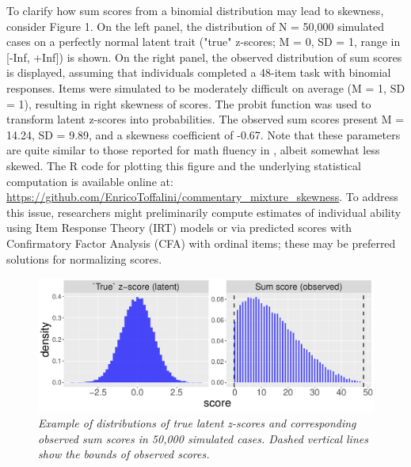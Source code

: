 \documentclass[letterpaper,11pt]{article}
\begin{document}
To clarify how sum scores from a binomial distribution may lead to skewness, consider Figure 1. On the left panel, the distribution of N = 50,000 simulated cases on a perfectly normal latent trait ("true" z-scores; M = 0, SD = 1, range in [-Inf, +Inf]) is shown. On the right panel, the observed distribution of sum scores is displayed, assuming that individuals completed a 48-item task with binomial responses. Items were simulated to be moderately difficult on average (M = 1, SD = 1), resulting in right skewness of scores. The probit function was used to transform latent z-scores into probabilities. The observed sum scores present M = 14.24, SD = 9.89, and a skewness coefficient of -0.67. Note that these parameters are quite similar to those reported for math fluency in , albeit somewhat less skewed. The R code for plotting this figure and the underlying statistical computation is available online at: \url{https://github.com/EnricoToffalini/commentary_mixture_skewness}. To address this issue, researchers might preliminarily compute estimates of individual ability using Item Response Theory (IRT) models or via predicted scores with Confirmatory Factor Analysis (CFA) with ordinal items; these may be preferred solutions for normalizing scores.

\begin{figure}[htbp]
	\label{fig:example}
	\caption{\newline \textit{Example of distributions of true latent z-scores and corresponding observed sum scores in 50,000 simulated cases. Dashed vertical lines show the bounds of observed scores.}}
	\centering
	\includegraphics[width=\textwidth]{../R code simulations/z-vs-sumscore.pdf}
\end{figure}
\end{document}
